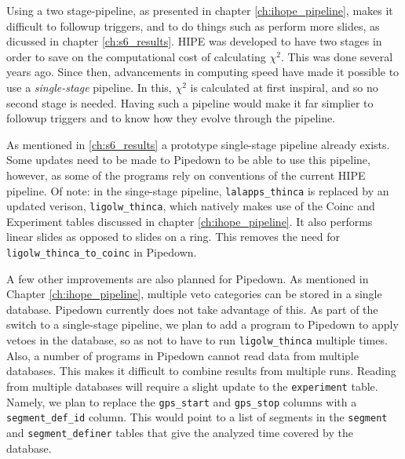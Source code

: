 Using a two stage-pipeline, as presented in chapter \ref{ch:ihope_pipeline}, makes it difficult to followup triggers, and to do things such as perform more slides, as dicussed in chapter \ref{ch:s6_results}. \ac{HIPE} was developed to have two stages in order to save on the computational cost of calculating $\chi^2$. This was done several years ago. Since then, advancements in computing speed have made it possible to use a \emph{single-stage} pipeline. In this, $\chi^2$ is calculated at first inspiral, and so no second stage is needed. Having such a pipeline would make it far simplier to followup triggers and to know how they evolve through the pipeline.

As mentioned in \ref{ch:s6_results} a prototype single-stage pipeline already exists. Some updates need to be made to Pipedown to be able to use this pipeline, however, as some of the programs rely on conventions of the current \ac{HIPE} pipeline. Of note: in the singe-stage pipeline, \verb|lalapps_thinca| is replaced by an updated verison, \verb|ligolw_thinca|, which natively makes use of the Coinc and Experiment tables discussed in chapter \ref{ch:ihope_pipeline}. It also performs linear slides as opposed to slides on a ring. This removes the need for \verb|ligolw_thinca_to_coinc| in Pipedown.

A few other improvements are also planned for Pipedown. As mentioned in Chapter \ref{ch:ihope_pipeline}, multiple veto categories can be stored in a single database. Pipedown currently does not take advantage of this. As part of the switch to a single-stage pipeline, we plan to add a program to Pipedown to apply vetoes in the database, so as not to have to run \verb|ligolw_thinca| multiple times. Also, a number of programs in Pipedown cannot read data from multiple databases. This makes it difficult to combine results from multiple runs. Reading from multiple databases will require a slight update to the \verb|experiment| table. Namely, we plan to replace the \verb|gps_start| and \verb|gps_stop| columns with a \verb|segment_def_id| column. This would point to a list of segments in the \verb|segment| and \verb|segment_definer| tables that give the analyzed time covered by the database.

